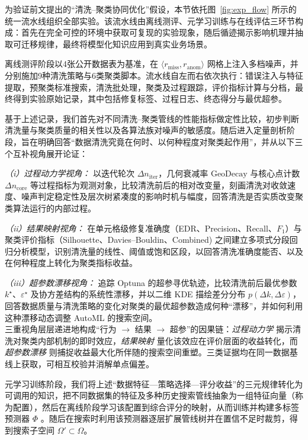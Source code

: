 \documentclass[10pt]{article} %
\numberwithin{equation}{section}
\begin{document}
为验证前文提出的“清洗–聚类协同优化”假设，本节依托图~\ref{fig:exp_flow} 所示的统一流水线组织全部实验。该流水线由离线测评、元学习训练与在线评估三环节构成：首先在完全可控的环境中获取可复现的实验现象，随后循迹揭示影响机理并抽取可迁移规律，最终将模型化知识应用到真实业务场景。

离线测评阶段以4张公开数据表为基准，在 \(\langle r_{\text{miss}},r_{\text{anom}}\rangle\) 网格上注入多档噪声，并分别施加9种清洗策略与6类聚类脚本。流水线自左而右依次执行：错误注入与特征提取，预聚类标准搜索，清洗批处理，聚类及过程跟踪，评价指标计算与分档，最终得到实验原始记录，其中包括修复标签、过程日志、终态得分与最优超参。

基于上述记录，我们首先对不同清洗–聚类管线的性能指标做定性比较，初步判断清洗量与聚类质量的相关性以及各算法族对噪声的敏感度。随后进入定量剖析阶段，旨在明确回答“数据清洗究竟在何时、以何种程度对聚类起作用”，并从以下三个互补视角展开论证：

\emph{（i）过程动力学视角：} 以迭代轮次 \(\Delta n_{\text{iter}}\)，几何衰减率 \(\text{GeoDecay}\) 与核心点计数 \(\Delta n_{\text{core}}\) 等过程指标为观测对象，比较清洗前后的相对改变量，刻画清洗对收敛速度、噪声判定稳定性及层次树紧凑度的影响时机与幅度，回答清洗是否实质改变聚类算法运行的内部过程。

\emph{（ii）结果映射视角：} 在单元格级修复准确度（EDR、Precision、Recall、\(F_1\)）与聚类评价指标（Silhouette、Davies–Bouldin、Combined) 之间建立多项式分段回归分析模型，识别清洗量的线性、阈值或饱和区段，以回答清洗准确度能否、以及在何种程度上转化为聚类指标收益。

\emph{（iii）超参数漂移视角：} 追踪 Optuna 的超参寻优轨迹，比较清洗前后最优参数 \(k^\star\)、\(\varepsilon^\star\) 及协方差结构的系统性漂移，并以二维 KDE 描绘差分分布 \(p(\Delta k,\Delta\varepsilon)\)，回答数据质量与清洗策略的变化对聚类的最优超参数造成何种“漂移”，并如何利用这种漂移动态调整 AutoML 的搜索空间。\\
三重视角层层递进地构成“行为 $\rightarrow$ 结果 $\rightarrow$ 超参”的因果链：\emph{过程动力学} 揭示清洗对聚类内部机制的即时效应，\emph{结果映射} 量化该效应在评价层面的收益转化，而 \emph{超参数漂移} 则捕捉收益最大化所伴随的搜索空间重塑。三类证据均在同一数据基线上获取，可相互校验并消解单点偏差。

元学习训练阶段，我们将上述“数据特征—策略选择—评分收益”的三元规律转化为可调用的知识，把不同数据集的特征及多种历史搜索管线抽象为一组特征向量（称为配置），然后在离线阶段学习该配置到综合评分的映射，从而训练并构建多标签预测器 $\varPhi$ 。随后在搜索时利用该预测器逐层扩展管线树并在置信不足时裁剪，得到搜索子空间 $\Omega' \subset \Omega$。 
\end{document}
